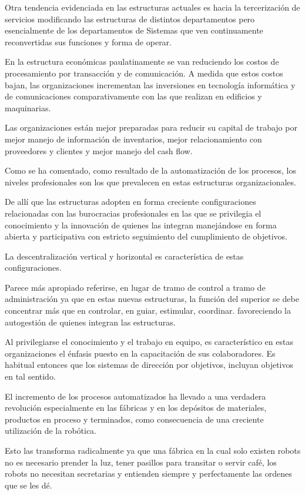 \documentclass[a4paper, 12pt]{article}
\begin{document}
Otra tendencia evidenciada en las estructuras actuales es hacia la tercerización de servicios modificando las estructuras de distintos departamentos pero esencialmente de los departamentos de Sistemas que ven continuamente reconvertidas sus funciones y forma de operar.

En la estructura económicas paulatinamente se van reduciendo los costos de procesamiento por transacción y de comunicación. A medida que estos costos bajan, las organizaciones incrementan las inversiones en tecnología informática y de comunicaciones comparativamente con las que realizan en edificios y maquinarias. 

Las organizaciones están mejor preparadas para reducir su capital de trabajo por mejor manejo de información de inventarios, mejor relacionamiento con proveedores y clientes y mejor manejo del cash flow.

Como se ha comentado, como resultado de la automatización de los procesos, los niveles profesionales son los que prevalecen en estas estructuras organizacionales.

De allí que las estructuras adopten en forma creciente configuraciones relacionadas con las burocracias profesionales en las que se privilegia el conocimiento y la innovación de quienes las integran manejándose en forma abierta y participativa con estricto seguimiento del cumplimiento de objetivos.

La descentralización vertical y horizontal es característica de estas configuraciones.

Parece más apropiado referirse, en lugar de tramo de control a tramo de administración ya que en estas nuevas estructuras, la función del superior se debe concentrar más que en controlar, en guiar, estimular, coordinar. favoreciendo la autogestión de quienes integran las estructuras.

Al privilegiarse el conocimiento y el trabajo en equipo, es característico en estas organizaciones el énfasis puesto en la capacitación de sus colaboradores. Es habitual entonces que los sistemas de dirección por objetivos, incluyan objetivos en tal sentido.

El incremento de los procesos automatizados ha llevado a una verdadera revolución especialmente en las fábricas y en los depósitos de materiales, productos en proceso y terminados, como consecuencia de una creciente utilización de la robótica.

Esto las transforma radicalmente ya que una fábrica en la cual solo existen robots no es necesario prender la luz, tener pasillos para transitar o servir café, los robots no necesitan secretarias y entienden siempre y perfectamente las ordenes que se les dé.
\end{document}
